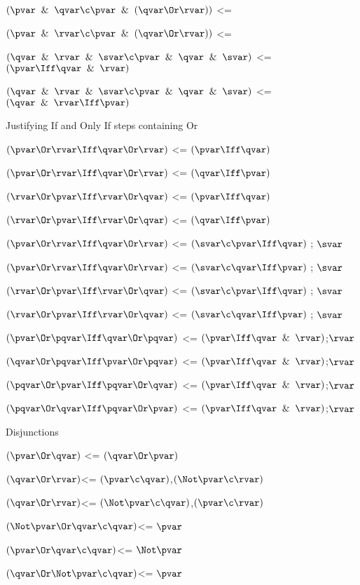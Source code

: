 $(\pvar \And \qvar \c \pvar \And (\qvar \Or \rvar))$ <=

$(\pvar \And \rvar \c \pvar \And (\qvar \Or \rvar))$ <=

$(\qvar \And \rvar \And \svar  \c \pvar \And \qvar \And \svar)$ <= $(\pvar \Iff \qvar \And \rvar)$

$(\qvar \And \rvar \And \svar  \c \pvar \And \qvar \And \svar)$ <= $(\qvar \And \rvar\Iff\pvar)$

\lineb

Justifying If and Only If steps containing Or

$(\pvar \Or \rvar \Iff \qvar \Or \rvar)$ <= $(\pvar \Iff \qvar)$

$(\pvar \Or \rvar \Iff \qvar \Or \rvar)$ <= $(\qvar \Iff \pvar)$

$(\rvar \Or \pvar \Iff \rvar \Or \qvar)$ <= $(\pvar \Iff \qvar)$

$(\rvar \Or \pvar \Iff \rvar \Or \qvar)$ <= $(\qvar \Iff \pvar)$

$(\pvar \Or \rvar \Iff \qvar \Or \rvar)$ <= $(\svar \c \pvar \Iff \qvar)$ ; $\svar$

$(\pvar \Or \rvar \Iff \qvar \Or \rvar)$ <= $(\svar \c \qvar \Iff \pvar)$ ; $\svar$

$(\rvar \Or \pvar \Iff \rvar \Or \qvar)$ <= $(\svar \c \pvar \Iff \qvar)$ ; $\svar$

$(\rvar \Or \pvar \Iff \rvar \Or \qvar)$ <= $(\svar \c \qvar \Iff \pvar)$ ; $\svar$


$(\pvar \Or \pqvar  \Iff \qvar \Or \pqvar)$ <= $(\pvar \Iff \qvar \And \rvar)$;$\rvar$

$(\qvar \Or \pqvar  \Iff \pvar \Or \pqvar)$ <= $(\pvar \Iff \qvar \And \rvar)$;$\rvar$

$(\pqvar \Or \pvar  \Iff \pqvar \Or \qvar)$ <= $(\pvar \Iff \qvar \And \rvar)$;$\rvar$

$(\pqvar \Or \qvar  \Iff \pqvar \Or \pvar)$ <= $(\pvar \Iff \qvar \And \rvar)$;$\rvar$
\lineb

Disjunctions
\lineb

$(\pvar \Or \qvar)$ <= $(\qvar \Or \pvar)$

$(\qvar \Or \rvar)$<= $(\pvar \c \qvar)$,$(\Not\pvar \c \rvar)$

$(\qvar \Or \rvar)$<= $(\Not\pvar \c \qvar)$,$(\pvar \c \rvar)$

$(\Not \pvar \Or \qvar \c \qvar)$<= $\pvar$

$(\pvar \Or \qvar \c \qvar)$<= $\Not \pvar$

$(\qvar \Or \Not \pvar \c \qvar)$<= $\pvar$

